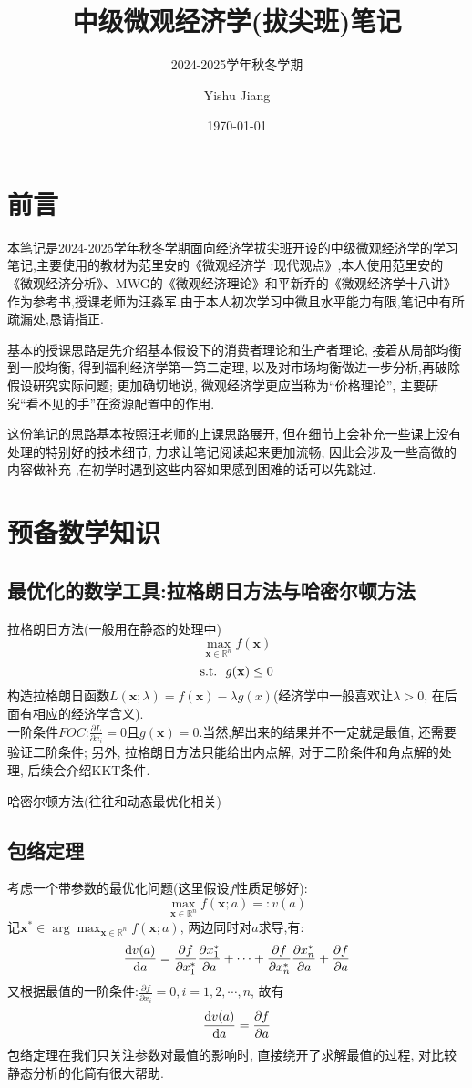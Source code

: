 \documentclass[lang=cn,10pt]{elegantbook}
\title{中级微观经济学(拔尖班)笔记}
\subtitle{2024-2025学年秋冬学期}
\author{Yishu Jiang}
\institute{School of Economics,Zhejiang University}
\date{\today}
\begin{document}
\maketitle
\frontmatter
\chapter*{前言}
{\fangsong 
    本笔记是2024-2025学年秋冬学期面向经济学拔尖班开设的中级微观经济学的学习笔记,主要使用的教材为范里安的《微观经济学 :现代观点》,本人使用范里安的《微观经济分析》、MWG的《微观经济理论》和平新乔的《微观经济学十八讲》作为参考书,授课老师为汪淼军.由于本人初次学习中微且水平能力有限,笔记中有所疏漏处,恳请指正.

    基本的授课思路是先介绍基本假设下的消费者理论和生产者理论, 接着从局部均衡到一般均衡, 得到福利经济学第一第二定理, 以及对市场均衡做进一步分析,再破除假设研究实际问题; 更加确切地说, 微观经济学更应当称为“价格理论”, 主要研究“看不见的手”在资源配置中的作用.

    这份笔记的思路基本按照汪老师的上课思路展开, 但在细节上会补充一些课上没有处理的特别好的技术细节, 力求让笔记阅读起来更加流畅, 因此会涉及一些高微的内容做补充 ,在初学时遇到这些内容如果感到困难的话可以先跳过.
}
\newpage

\tableofcontents

\mainmatter
\chapter{预备数学知识}
\section{最优化的数学工具:拉格朗日方法与哈密尔顿方法}
拉格朗日方法(一般用在静态的处理中)
$$\max_{\mathbf{x}\in\mathbb{R}^n}f(\mathbf{x})$$
$${\rm s.t.} \ \ g(\mathbf{x})\leq 0$$
构造拉格朗日函数$L(\mathbf{x};\lambda) = f(\mathbf{x})-\lambda g(x)$(经济学中一般喜欢让$\lambda>0$, 在后面有相应的经济学含义).\\
一阶条件$FOC$:$\frac{\partial L}{\partial x_i}=0$且$g(\mathbf{x})=0$.当然,解出来的结果并不一定就是最值, 还需要验证二阶条件; 另外, 拉格朗日方法只能给出内点解, 对于二阶条件和角点解的处理, 后续会介绍KKT条件.

哈密尔顿方法(往往和动态最优化相关)

\section{包络定理}
考虑一个带参数的最优化问题(这里假设$f$性质足够好):
$$\max_{\mathbf{x}\in\mathbb{R}^n}f(\mathbf{x};a)=:v(a)$$
记$\mathbf{x}^*\in\arg \max_{\mathbf{x}\in\mathbb{R}^n}f(\mathbf{x};a)$, 两边同时对$a$求导,有:
$$\frac{{\rm d}v(a)}{{\rm d}a}=\frac{\partial f}{\partial x_1^{*}}\frac{\partial x_{1}^{*}}{\partial a}+\cdots+\frac{\partial f}{\partial x_{n}^{*}}\frac{\partial x_{n}^{*}}{\partial a}+\frac{\partial f}{\partial a}$$
又根据最值的一阶条件:$\frac{\partial f}{\partial x_i}=0,i=1,2,\cdots,n$, 故有$$\frac{{\rm d}v(a)}{{\rm d}a}=\frac{\partial f}{\partial a}$$
包络定理在我们只关注参数对最值的影响时, 直接绕开了求解最值的过程, 对比较静态分析的化简有很大帮助.
\end{document}
